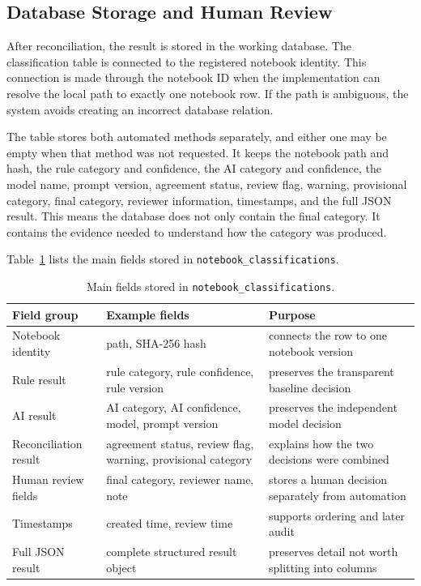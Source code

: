 \subsection{Database Storage and Human Review}

After reconciliation, the result is stored in the working database. The classification table is connected to the registered notebook identity. This connection is made through the notebook ID when the implementation can resolve the local path to exactly one notebook row. If the path is ambiguous, the system avoids creating an incorrect database relation.

The table stores both automated methods separately, and either one may be empty when that method was not requested. It keeps the notebook path and hash, the rule category and confidence, the AI category and confidence, the model name, prompt version, agreement status, review flag, warning, provisional category, final category, reviewer information, timestamps, and the full JSON result. This means the database does not only contain the final category. It contains the evidence needed to understand how the category was produced.

Table~\ref{tab:classification-fields} lists the main fields stored in \texttt{notebook\_classifications}.

\begin{table}[ht]
\centering
\caption{Main fields stored in \texttt{notebook\_classifications}.}
\label{tab:classification-fields}
\small
\begin{tabularx}{\textwidth}{@{}p{2.9cm}p{4.4cm}X@{}}
\toprule
Field group & Example fields & Purpose\tabularnewline
\midrule
Notebook identity & path, SHA-256 hash & connects the row to one notebook version\tabularnewline
Rule result & rule category, rule confidence, rule version & preserves the transparent baseline decision\tabularnewline
AI result & AI category, AI confidence, model, prompt version & preserves the independent model decision\tabularnewline
Reconciliation result & agreement status, review flag, warning, provisional category & explains how the two decisions were combined\tabularnewline
Human review fields & final category, reviewer name, note & stores a human decision separately from automation\tabularnewline
Timestamps & created time, review time & supports ordering and later audit\tabularnewline
Full JSON result & complete structured result object & preserves detail not worth splitting into columns\tabularnewline
\bottomrule
\end{tabularx}
\end{table}

